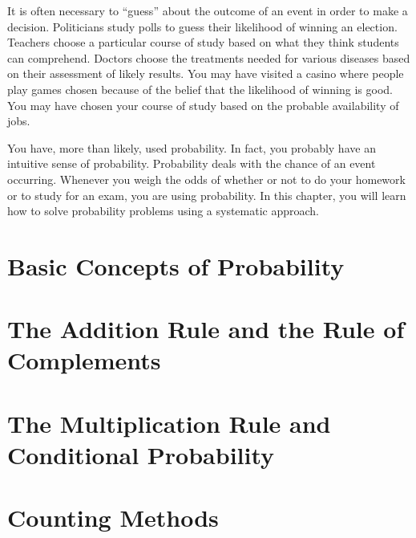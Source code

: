 \documentclass[9pt,letter,twoside,openright]{memoir}
\begin{document}
It is often necessary to ``guess'' about the outcome of an event in order to make a decision. Politicians study polls to guess
their likelihood of winning an election. Teachers choose a particular course of study based on what they think students can
comprehend. Doctors choose the treatments needed for various diseases based on their assessment of likely results. You
may have visited a casino where people play games chosen because of the belief that the likelihood of winning is good. You
may have chosen your course of study based on the probable availability of jobs.

You have, more than likely, used probability. In fact, you probably have an intuitive sense of probability. Probability deals with the chance of an event occurring. Whenever you weigh the odds of whether or not to do your homework or to study for an exam, you are using probability. In this chapter, you will learn how to solve probability problems using a systematic approach.
\vfill
\pagebreak

\section{Basic Concepts of Probability}



\section{The Addition Rule and the Rule of Complements}



\section{The Multiplication Rule and Conditional Probability}



\section{Counting Methods}


\end{document}
